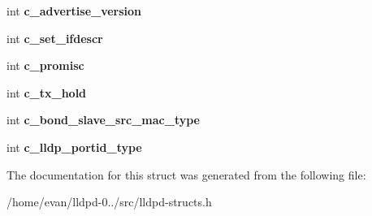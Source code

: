 \begin{DoxyCompactItemize}
\item 
int {\bfseries c\-\_\-advertise\-\_\-version}\label{structlldpd__config_a084c40ef1ff800ad4804df12262bf622}

\item 
int {\bfseries c\-\_\-set\-\_\-ifdescr}\label{structlldpd__config_aab7f8cb4fa2b5172b8b4ddbbcc5dd6b3}

\item 
int {\bfseries c\-\_\-promisc}\label{structlldpd__config_a15fca8f7ab17f59fcbe72bf200525410}

\item 
int {\bfseries c\-\_\-tx\-\_\-hold}\label{structlldpd__config_a0dfbe5278932f006489bf67de29c190a}

\item 
int {\bfseries c\-\_\-bond\-\_\-slave\-\_\-src\-\_\-mac\-\_\-type}\label{structlldpd__config_ad740d60e695ebeaba49c2bbf56e1dd9b}

\item 
int {\bfseries c\-\_\-lldp\-\_\-portid\-\_\-type}\label{structlldpd__config_adeb32afa7d4d925f94551d0f29af62a5}

\end{DoxyCompactItemize}


\-The documentation for this struct was generated from the following file\-:\begin{DoxyCompactItemize}
\item 
/home/evan/lldpd-\/0../src/lldpd-\/structs.\-h\end{DoxyCompactItemize}
